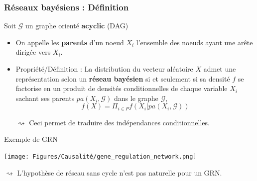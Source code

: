     
     \begin{frame}
   \frametitle{Réseaux bayésiens : Définition}
   
	Soit $\mathcal{G}$ un graphe orienté \textbf{acyclic} (DAG)
	 \begin{itemize}
\item On appelle les \textbf{parents} d'un noeud $X_i$  l'ensemble des noeuds ayant une arête dirigée vers $X_i$. 
\pause 

\item Propriété/Définition : La distribution du vecteur aléatoire $X$ admet une représentation selon un \textbf{réseau bayésien} si et seulement si sa densité $f$ se factorise en un produit de densités conditionnelles de chaque variable $X_i$ sachant ses parents $pa(X_i,\mathcal{G})$ dans le graphe $\mathcal{G}$, 
$$ f(X) = \Pi_{i \in P} f(X_i\vert pa(X_i,\mathcal{G}) )$$

\pause 

$\rightsquigarrow$ Ceci permet de traduire des indépendances conditionnelles. 

\end{itemize}
	 \end{frame}




	
	 \begin{frame}{Exemple de GRN}
	 

	  \begin{center}
	     \texttt{[image: Figures/Causalité/gene\_regulation\_network.png]}
	   \end{center}
	   
	   \vspace{-0.5cm}
	   
{\scriptsize \cite{ChenEtal2019}	   }

	   
\pause 


	  	  $\rightsquigarrow$ L'hypothèse de réseau sans cycle n'est pas naturelle pour un GRN. 
	  	  	 





	     
	     
	 \end{frame}
	 


